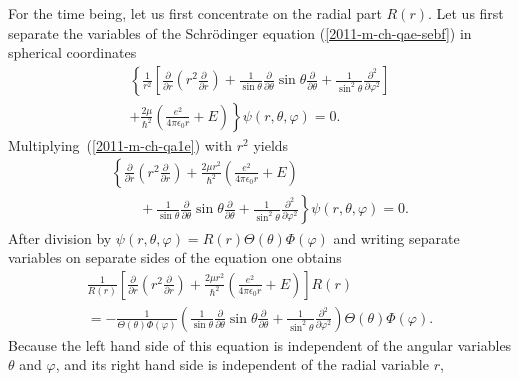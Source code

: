 For the time being, let us first concentrate on
the radial part $R(r)$.
Let us first separate the variables of
the Schr\"odinger equation (\ref{2011-m-ch-qae-sebf})
in spherical coordinates
\begin{equation}
\begin{split}
\left\{
\frac{1}{r^2} \left[ \frac{\partial}{\partial r}\left( r^2\frac{\partial}{\partial r}\right)
+
\frac{1}{\sin \theta}   \frac{\partial}{\partial \theta }
\sin \theta \frac{\partial}{\partial \theta }
+
\frac{1}{\sin^2 \theta} \frac{\partial^2}{\partial \varphi^2 }
\right]
\right.    \\
+
\left.
\frac{2\mu }{\hslash^2} \left(\frac{e^2}{4\pi \epsilon_0 r} + E \right)\right\}
\psi (r, \theta ,\varphi  )=0
.
\end{split}
\label{2011-m-ch-qa1e}
\end{equation}
Multiplying~(\ref{2011-m-ch-qa1e}) with $r^2$ yields
\begin{equation}
\begin{split}
\left\{  \frac{\partial}{\partial r}\left( r^2\frac{\partial}{\partial r}\right) +
\frac{2\mu r^2}{\hslash^2} \left(\frac{e^2}{4\pi \epsilon_0 r} + E \right) \right.  \\
\qquad
+  \left.
\frac{1}{\sin \theta}   \frac{\partial}{\partial \theta }
\sin \theta \frac{\partial}{\partial \theta }
+
\frac{1}{\sin^2 \theta} \frac{\partial^2}{\partial \varphi^2 }
\right\}
\psi (r, \theta ,\varphi  )=0
.
\end{split}
\label{2011-m-ch-qae2}
\end{equation}
After division by $\psi (r, \theta ,\varphi  )= R(r)\Theta(\theta)\Phi(\varphi)$
and writing separate variables on separate sides of the equation one obtains
\begin{equation}
\begin{split}
\frac{1}{R( r )}
\left[  \frac{\partial}{\partial r}\left( r^2\frac{\partial}{\partial r}\right) +
\frac{2\mu r^2}{\hslash^2} \left(\frac{e^2}{4\pi \epsilon_0 r} + E \right) \right] R(r)
\qquad
\\  =
-\frac{1}{\Theta(\theta)\Phi(\varphi)} \left(
\frac{1}{\sin \theta}   \frac{\partial}{\partial \theta }
\sin \theta \frac{\partial}{\partial \theta }
+
\frac{1}{\sin^2 \theta} \frac{\partial^2}{\partial \varphi^2 }
\right)
\Theta(\theta)\Phi(\varphi)
.
\end{split}
\label{2011-m-ch-qae3}
\end{equation}
Because the left hand side  of this equation is independent of the angular variables
$\theta $ and $\varphi$, and its right hand side  is independent of the radial variable $r$,

